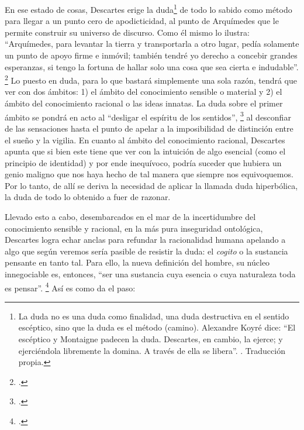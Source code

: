 En ese estado de cosas, Descartes erige la duda\footnote{La duda no es una duda como finalidad, una duda destructiva en el sentido escéptico, sino que la duda es el método (camino). Alexandre Koyré dice: \enquote{El escéptico y Montaigne padecen la duda. Descartes, en cambio, la ejerce; y ejerciéndola libremente la domina. A través de ella se libera}. \cite[][196]{@7115-KOYRE1984}. Traducción propia.} de todo lo sabido como método para llegar a un punto cero de apodicticidad, al punto de Arquímedes que le permite construir su universo de discurso. Como él mismo lo ilustra: \enquote{Arquímedes, para levantar la tierra y transportarla a otro lugar, pedía solamente un punto de apoyo firme e inmóvil; también tendré yo derecho a concebir grandes esperanzas, si tengo la fortuna de hallar solo una cosa que sea cierta e indudable}. \footcite[][119]{@7116-DESCARTES1941} Lo puesto en duda, para lo que bastará simplemente una sola razón, tendrá que ver con dos ámbitos: 1) el ámbito del conocimiento sensible o material y 2) el ámbito del conocimiento racional o las ideas innatas. La duda sobre el primer ámbito se pondrá en acto al \enquote{desligar el espíritu de los sentidos}, \footcite[][107]{@7116-DESCARTES1941} al desconfiar de las sensaciones hasta el punto de apelar a la imposibilidad de distinción entre el sueño y la vigilia. En cuanto al ámbito del conocimiento racional, Descartes apunta que si bien este tiene que ver con la intuición de algo esencial (como el principio de identidad) y por ende inequívoco, podría suceder que hubiera un genio maligno que nos haya hecho de tal manera que siempre nos equivoquemos. Por lo tanto, de allí se deriva la necesidad de aplicar la llamada duda hiperbólica, la duda de todo lo obtenido a fuer de razonar.

Llevado esto a cabo, desembarcados en el mar de la incertidumbre del conocimiento sensible y racional, en la más pura inseguridad ontológica, Descartes logra echar anclas para refundar la racionalidad humana apelando a algo que según veremos sería pasible de resistir la duda: el \emph{cogito} o la sustancia pensante en tanto tal. Para ello, la nueva definición del hombre, su núcleo innegociable es, entonces, \enquote{ser una sustancia cuya esencia o cuya naturaleza toda es pensar}. \footcite[][173]{@7116-DESCARTES1941} Así es como da el paso:

